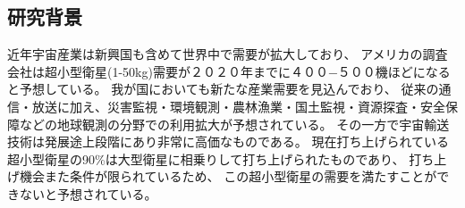 \subsection{研究背景}
近年宇宙産業は新興国も含めて世界中で需要が拡大しており、
アメリカの調査会社は超小型衛星(1-50kg)需要が２０２０年までに４００−５００機ほどになると予想している。\cite{nano/micro}
我が国においても新たな産業需要を見込んでおり、
従来の通信・放送に加え、災害監視・環境観測・農林漁業・国土監視・資源探査・安全保障などの地球観測の分野での利用拡大が予想されている。
その一方で宇宙輸送技術は発展途上段階にあり非常に高価なものである。
現在打ち上げられている超小型衛星の90\%は大型衛星に相乗りして打ち上げられたものであり、
打ち上げ機会また条件が限られているため、
この超小型衛星の需要を満たすことができないと予想されている。
